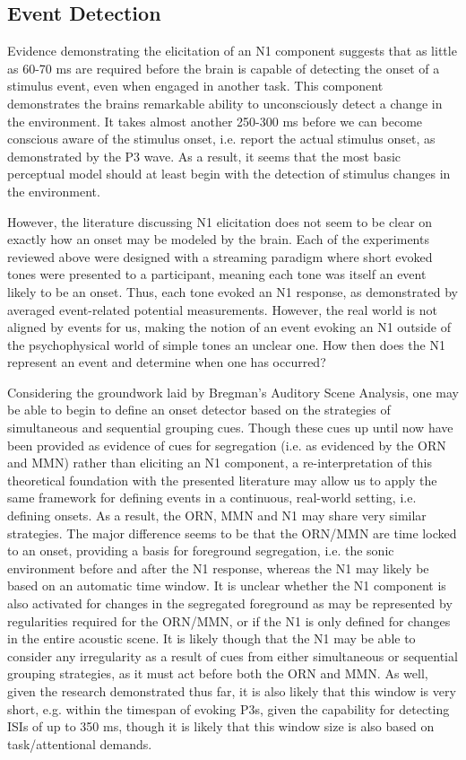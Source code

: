 \documentclass[a4paper,10pt,final]{ThesisStyle}
\begin{document}
\subsection{Event Detection}

Evidence demonstrating the elicitation of an N1 component suggests that as little as 60-70 ms are required before the brain is capable of detecting the onset of a stimulus event, even when engaged in another task.  This component demonstrates the brains remarkable ability to unconsciously detect a change in the environment.  It takes almost another 250-300 ms before we can become conscious aware of the stimulus onset, i.e. report the actual stimulus onset, as demonstrated by the P3 wave.  As a result, it seems that the most basic perceptual model should at least begin with the detection of stimulus changes in the environment.  

However, the literature discussing N1 elicitation does not seem to be clear on exactly how an onset may be modeled by the brain.  Each of the experiments reviewed above were designed with a streaming paradigm where short evoked tones were presented to a participant, meaning each tone was itself an event likely to be an onset.  Thus, each tone evoked an N1 response, as demonstrated by averaged event-related potential measurements.  However, the real world is not aligned by events for us, making the notion of an event evoking an N1 outside of the psychophysical world of simple tones an unclear one.  How then does the N1 represent an event and determine when one has occurred?

Considering the groundwork laid by Bregman's Auditory Scene Analysis, one may be able to begin to define an onset detector based on the strategies of simultaneous and sequential grouping cues.  Though these cues up until now have been provided as evidence of cues for segregation (i.e. as evidenced by the ORN and MMN) rather than eliciting an N1 component, a re-interpretation of this theoretical foundation with the presented literature may allow us to apply the same framework for defining events in a continuous, real-world setting, i.e. defining onsets.  As a result, the ORN, MMN and N1 may share very similar strategies.  The major difference seems to be that the ORN/MMN are time locked to an onset, providing a basis for foreground segregation, i.e. the sonic environment before and after the N1 response, whereas the N1 may likely be based on an automatic time window.  It is unclear whether the N1 component is also activated for changes in the segregated foreground as may be represented by regularities required for the ORN/MMN, or if the N1 is only defined for changes in the entire acoustic scene.  It is likely though that the N1 may be able to consider any irregularity as a result of cues from either simultaneous or sequential grouping strategies, as it must act before both the ORN and MMN.  As well, given the research demonstrated thus far, it is also likely that this window is very short, e.g. within the timespan of evoking P3s, given the capability for detecting ISIs of up to 350 ms, though it is likely that this window size is also based on task/attentional demands.  
\end{document}
